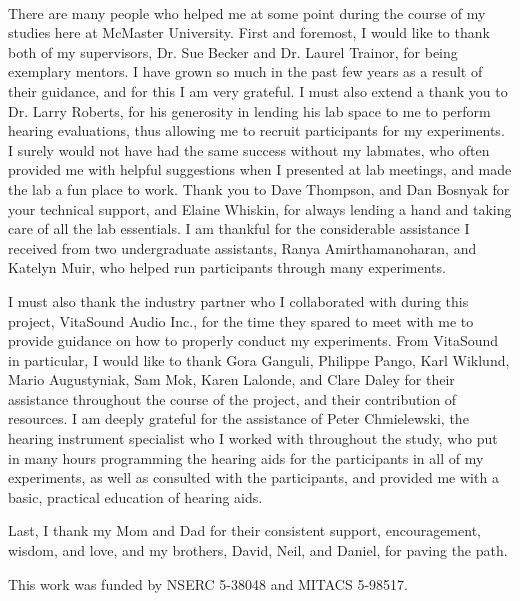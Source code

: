
\paragraph{}There are many people who helped me at some point during the course of my studies here at McMaster University.  First and foremost, I would like to thank both of my supervisors, Dr. Sue Becker and Dr. Laurel Trainor, for being exemplary mentors.  I have grown so much in the past few years as a result of their guidance, and for this I am very grateful.  I must also extend a thank you to Dr. Larry Roberts, for his generosity in lending his lab space to me to perform hearing evaluations, thus allowing me to recruit participants for my experiments.  I surely would not have had the same success without my labmates, who often provided me with helpful suggestions when I presented at lab meetings, and made the lab a fun place to work.  Thank you to Dave Thompson, and Dan Bosnyak for your technical support, and Elaine Whiskin, for always lending a hand and taking care of all the lab essentials.  I am thankful for the considerable assistance I received from two undergraduate assistants, Ranya Amirthamanoharan, and Katelyn Muir, who helped run participants through many experiments.

I must also thank the industry partner who I collaborated with during this project, VitaSound Audio Inc., for the time they spared to meet with me to provide guidance on how to properly conduct my experiments.  From VitaSound in particular, I would like to thank Gora Ganguli, Philippe Pango, Karl Wiklund, Mario Augustyniak, Sam Mok, Karen Lalonde, and Clare Daley for their assistance throughout the course of the project, and their contribution of resources.  I am deeply grateful for the assistance of Peter Chmielewski, the hearing instrument specialist who I worked with throughout the study, who put in many hours programming the hearing aids for the participants in all of my experiments, as well as consulted with the participants, and provided me with a basic, practical education of hearing aids.

Last, I thank my Mom and Dad for their consistent support, encouragement, wisdom, and love, and my brothers, David, Neil, and Daniel, for paving the path.

This work was funded by NSERC 5-38048 and MITACS 5-98517. 
